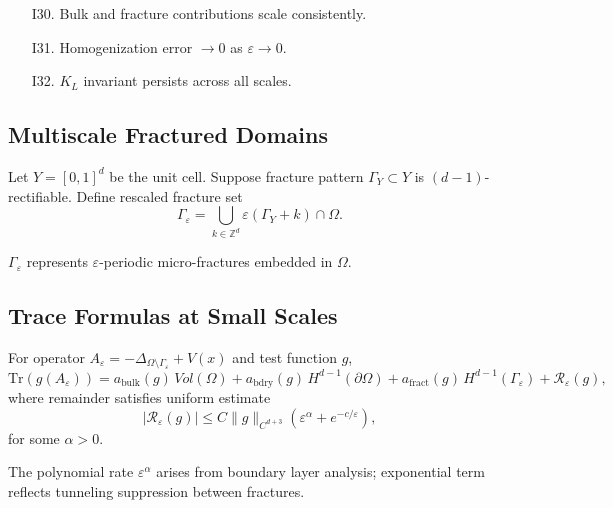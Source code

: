 \begin{itemize}
  \item[I30.] Bulk and fracture contributions scale consistently. 
  \item[I31.] Homogenization error $\to 0$ as $\varepsilon\to 0$. 
  \item[I32.] $K_L$ invariant persists across all scales. 
\end{itemize}

\subsection{Multiscale Fractured Domains}

\begin{definition}
Let $Y=[0,1]^d$ be the unit cell.  
Suppose fracture pattern $\Gamma_Y \subset Y$ is $(d-1)$-rectifiable.  
Define rescaled fracture set
\[
\Gamma_\varepsilon = \bigcup_{k\in \mathbb{Z}^d} \varepsilon(\Gamma_Y + k) \cap \Omega.
\]
\end{definition}

\begin{remark}
$\Gamma_\varepsilon$ represents $\varepsilon$-periodic micro-fractures embedded in $\Omega$. 
\end{remark}

\subsection{Trace Formulas at Small Scales}

\begin{theorem}
\label{thm:trace-eps}
For operator $A_\varepsilon = -\Delta_{\Omega \setminus \Gamma_\varepsilon} + V(x)$ and test function $g$,  
\[
\mathrm{Tr}(g(A_\varepsilon)) = a_{\mathrm{bulk}}(g) \, Vol(\Omega) 
+ a_{\mathrm{bdry}}(g) \, H^{d-1}(\partial \Omega) 
+ a_{\mathrm{fract}}(g) \, H^{d-1}(\Gamma_\varepsilon) 
+ \mathcal{R}_\varepsilon(g),
\]
where remainder satisfies uniform estimate
\[
|\mathcal{R}_\varepsilon(g)| \leq C \|g\|_{C^{d+3}} 
\left( \varepsilon^{\alpha} + e^{-c/\varepsilon} \right),
\]
for some $\alpha>0$. 
\end{theorem}

\begin{remark}
The polynomial rate $\varepsilon^{\alpha}$ arises from boundary layer analysis; exponential term reflects tunneling suppression between fractures. 
\end{remark}

